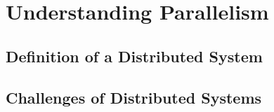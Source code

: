 \section{Understanding Parallelism}

\subsection{Definition of a Distributed System}

\subsection{Challenges of Distributed Systems}
